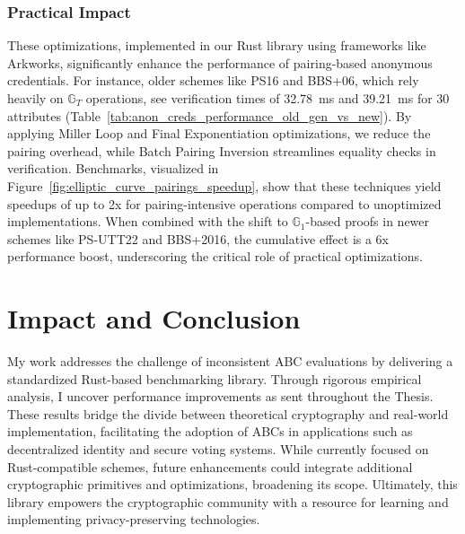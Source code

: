 \subsubsection*{Practical Impact}
These optimizations, implemented in our Rust library using frameworks like Arkworks, significantly enhance the performance of pairing-based anonymous credentials. For instance, older schemes like PS16 and BBS+06, which rely heavily on $\mathbb{G}_T$ operations, see verification times of 32.78~ms and 39.21~ms for 30 attributes (Table~\ref{tab:anon_creds_performance_old_gen_vs_new}). By applying Miller Loop and Final Exponentiation optimizations, we reduce the pairing overhead, while Batch Pairing Inversion streamlines equality checks in verification. Benchmarks, visualized in Figure~\ref{fig:elliptic_curve_pairings_speedup}, show that these techniques yield speedups of up to 2x for pairing-intensive operations compared to unoptimized implementations. When combined with the shift to $\mathbb{G}_1$-based proofs in newer schemes like PS-UTT22 and BBS+2016, the cumulative effect is a 6x performance boost, underscoring the critical role of practical optimizations.



\section{Impact and Conclusion}

My work addresses the challenge of inconsistent ABC evaluations by delivering a standardized Rust-based benchmarking library. Through rigorous empirical analysis, I uncover performance improvements as sent throughout the Thesis. These results bridge the divide between theoretical cryptography and real-world implementation, facilitating the adoption of ABCs in applications such as decentralized identity and secure voting systems. While currently focused on Rust-compatible schemes, future enhancements could integrate additional cryptographic primitives and optimizations, broadening its scope. Ultimately, this library empowers the cryptographic community with a resource for learning and implementing privacy-preserving technologies.




